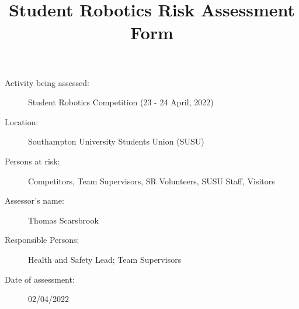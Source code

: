 \documentclass[12pt,a4paper]{scrartcl}
\title{Student Robotics Risk Assessment Form}
\begin{document}
\maketitle

\begin{description}
\item[Activity being assessed:] Student Robotics Competition (23 - 24 April, 2022)
\item[Location:] Southampton University Students Union (SUSU)
\item[Persons at risk:] Competitors, Team Supervisors, SR Volunteers, SUSU Staff, Visitors
\end{description}

\begin{description}
\item[Assessor's name:] Thomas Scarsbrook
\item[Responsible Persons:] Health and Safety Lead; Team Supervisors
\item[Date of assessment:] 02/04/2022
\end{description}
\clearpage

\newcommand{\risk}[4]{
	#1 & #2 & #3 & #4 \\
}
\end{document}
